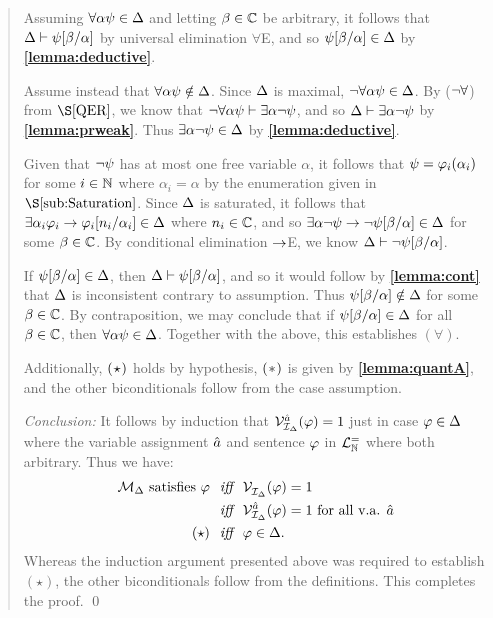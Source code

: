\begin{quote}
  Assuming $\forall \alpha\psi \in \Delta$ and letting $\beta \in \mathbb{C}$ be arbitrary, it follows that $\Delta \vdash \psi[\beta/\alpha]$ by universal elimination $\forall$E, and so $\psi[\beta/\alpha] \in \Delta$ by \textbf{\ref{lemma:deductive}}. 

  Assume instead that $\forall \alpha\psi \notin \Delta$.
  Since $\Delta$ is maximal, $\neg\forall \alpha\psi \in \Delta$.
  By ($\neg\forall$) from $\S\ref{QER}$, we know that $\neg\forall \alpha\psi \vdash \exists \alpha\neg\psi$, and so $\Delta \vdash \exists \alpha\neg\psi$ by \textbf{\ref{lemma:prweak}}.
  Thus $\exists \alpha\neg\psi \in \Delta$ by \textbf{\ref{lemma:deductive}}.

  Given that $\neg\psi$ has at most one free variable $\alpha$, it follows that $\psi=\varphi_i(\alpha_i)$ for some $i\in\mathbb{N}$ where $\alpha_i=\alpha$ by the enumeration given in $\S\ref{sub:Saturation}$.
  Since $\Delta$ is saturated, it follows that $\exists \alpha_i \varphi_i \rightarrow \varphi_i[n_i/\alpha_i] \in \Delta$ where $n_i\in\mathbb{C}$, and so $\exists \alpha\neg\psi \rightarrow \neg\psi[\beta/\alpha] \in  \Delta$ for some $\beta \in \mathbb{C}$.
  By conditional elimination $\rightarrow$E, we know $\Delta \vdash \neg\psi[\beta/\alpha]$.

  If $\psi[\beta/\alpha] \in \Delta$, then $\Delta \vdash \psi[\beta/\alpha]$, and so it would follow by \textbf{\ref{lemma:cont}} that $\Delta$ is inconsistent contrary to assumption. 
  Thus $\psi[\beta/\alpha] \notin \Delta$ for some $\beta \in \mathbb{C}$.
  By contraposition, we may conclude that if $\psi[\beta/\alpha] \in \Delta$ for all $\beta \in \mathbb{C}$, then $\forall \alpha\psi \in \Delta$.
  Together with the above, this establishes $(\forall)$. 

  Additionally, $(\hspace{.7pt}\star\hspace{.7pt})$ holds by hypothesis, $(\hspace{.7pt}\ast\hspace{.7pt})$ is given by \textbf{\ref{lemma:quantA}}, and the other biconditionals follow from the case assumption.

  \textit{Conclusion:}
  It follows by induction that $\mathcal{V}_{\mathcal{I}_{\Delta}}^{\hat{a}}(\varphi)=1$ just in case $\varphi\in\Delta$ where the variable assignment $\hat{a}$ and sentence $\varphi$ in $\mathcal{L}^{=}_{\mathbb{N}}$ where both arbitrary. 
  Thus we have:
  \begin{align*}
    \mathcal{M}_{\Delta} \text{ satisfies } \varphi &\textit{ ~iff~ } \mathcal{V}_{\mathcal{I}_{\Delta}}^{}(\varphi)=1\\
      &\textit{ ~iff~ } \mathcal{V}_{\mathcal{I}_{\Delta}}^{\hat{a}}(\varphi)=1 \text{ for all v.a. } \hat{a}\\
      (\star) &\textit{ ~iff~ } \varphi\in\Delta.
  \end{align*}
  Whereas the induction argument presented above was required to establish $(\star)$, the other biconditionals follow from the definitions.
  This completes the proof.
  \qed
\end{quote}

